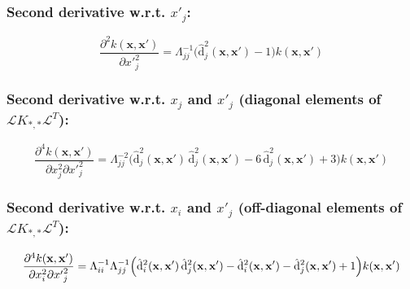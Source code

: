 \subsubsection{Second derivative w.r.t. $x'_{j}$:}
\begin{equation}
    \frac{\partial^2 k(\mathbf{x}, \mathbf{x}')}{\partial {x'}_j^2}  = \Lambda_{jj}^{-1} \Big(\hat{\mathrm{d}}_j^2(\mathbf{x}, \mathbf{x}')  - 1\Big) k(\mathbf{x}, \mathbf{x}')
\end{equation}

\subsubsection{Second derivative w.r.t. $x_{j}$ and $x'_{j}$ (diagonal elements of $\mathcal{L} K_{*,*} \mathcal{L}^T$):}
\begin{equation}
    \frac{\partial^4 k(\mathbf{x}, \mathbf{x}')}{\partial x_{j}^2 \partial {x'}_{j}^2}  = \Lambda_{jj}^{-2} \Big(\hat{\mathrm{d}}_j^2(\mathbf{x}, \mathbf{x}') \,\hat{\mathrm{d}}_j^2(\mathbf{x}, \mathbf{x}')- 6\, \hat{\mathrm{d}}_j^2(\mathbf{x}, \mathbf{x}') +3 \Big) k(\mathbf{x}, \mathbf{x}')
\end{equation}
\subsubsection{Second derivative w.r.t. $x_{i}$ and $x'_{j}$ (off-diagonal elements of $\mathcal{L} K_{*,*} \mathcal{L}^T$):}
\begin{equation}
    \frac{\partial^4 k(\mathbf{x}, \mathbf{x}')}{\partial x_{i}^2 \partial {x'}_{j}^2}  = \Lambda_{ii}^{-1}\Lambda_{jj}^{-1} \Big(\hat{\mathrm{d}}_i^2(\mathbf{x}, \mathbf{x}')\, \hat{\mathrm{d}}_j^2(\mathbf{x}, \mathrm{\mathbf{x}}') - \hat{\mathrm{d}}_i^2(\mathrm{\mathbf{x}}, \mathrm{\mathbf{x}}') - \hat{\mathrm{d}}_j^2(\mathrm{\mathbf{x}}, \mathrm{\mathbf{x}}') +1 \Big) k(\mathrm{\mathbf{x}}, \mathrm{\mathbf{x}}')
\end{equation}

